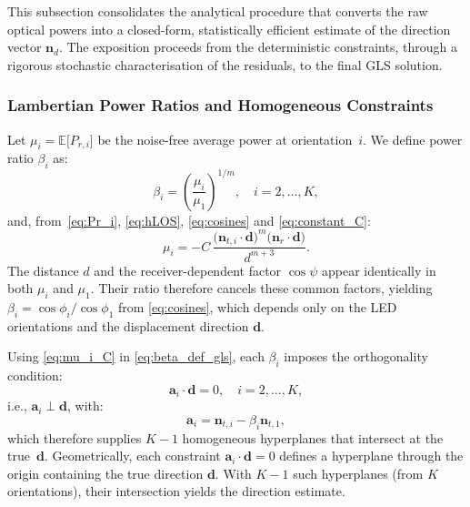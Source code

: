 \documentclass[journal]{IEEEtran}
\newcommand{\added}[1]{{\color{blue}#1}}
\begin{document}
This subsection consolidates the analytical procedure that converts the raw optical powers into a closed-form, statistically efficient estimate of the direction vector $\mathbf{n}_d$. The exposition proceeds from the deterministic constraints, through a rigorous stochastic characterisation of the residuals, to the final GLS solution. 

\subsubsection{Lambertian Power Ratios and Homogeneous Constraints}
Let $\mu_i=\mathbb E\!\bigl[P_{r,i}\bigr]$ be the noise-free average power at
orientation~$i$. We define power ratio $\beta_i$ as:
\begin{equation}
  \beta_i=\left(\frac{\mu_i}{\mu_1}\right)^{1/m}, \quad i=2,\ldots,K,
  \label{eq:beta_def_gls}
\end{equation}
and, from~\eqref{eq:Pr_i}, \eqref{eq:hLOS}, \eqref{eq:cosines} and \eqref{eq:constant_C}:
\begin{equation}
\mu_i=-C\,\frac{\bigl(\mathbf{n}_{t,i}\cdot\mathbf{d}\bigr)^{m}
\bigl(\mathbf{n}_r\cdot\mathbf{d}\bigr)}{d^{m+3}}.
\label{eq:mu_i_C}
\end{equation}
\added{The distance $d$ and the receiver-dependent factor $\cos\psi$ appear identically in both $\mu_i$ and $\mu_1$. Their ratio therefore cancels these common factors, yielding $\beta_i = \cos\phi_i / \cos\phi_1$ from \eqref{eq:cosines}, which depends only on the LED orientations and the displacement direction $\mathbf{d}$.}

Using \eqref{eq:mu_i_C} in \eqref{eq:beta_def_gls}, each $\beta_i$ imposes the orthogonality condition:
\begin{equation}
  \mathbf a_i\cdot
  \mathbf d=0,
  \quad
  i=2,\ldots,K,
  \label{eq:homog_gls}
\end{equation}
i.e., $\mathbf a_i \perp \mathbf d$, with:
\begin{equation}
\mathbf a_i\!=\!\mathbf n_{t,i}-\beta_i\mathbf n_{t,1}, 
\label{eq:definition_a_i}
\end{equation}
which therefore supplies $K-1$ homogeneous hyperplanes that intersect at the true~$\mathbf d$.
\added{Geometrically, each constraint $\mathbf{a}_i\cdot\mathbf{d}=0$ defines a hyperplane through the origin containing the true direction $\mathbf{d}$. With $K-1$ such hyperplanes (from $K$ orientations), their intersection yields the direction estimate.}
\end{document}
